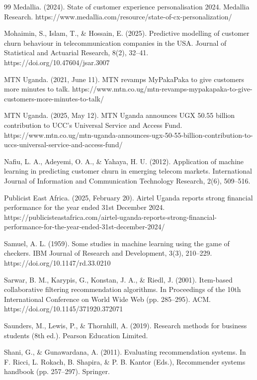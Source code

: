 \begin{thebibliography}{99}
Medallia. (2024). State of customer experience personalisation 2024. Medallia Research. https://www.medallia.com/resource/state-of-cx-personalization/

Mohaimin, S., Islam, T., \& Hossain, E. (2025). Predictive modelling of customer churn behaviour in telecommunication companies in the USA. Journal of Statistical and Actuarial Research, 8(2), 32--41. https://doi.org/10.47604/jsar.3007

MTN Uganda. (2021, June 11). MTN revamps MyPakaPaka to give customers more minutes to talk. https://www.mtn.co.ug/mtn-revamps-mypakapaka-to-give-customers-more-minutes-to-talk/

MTN Uganda. (2025, May 12). MTN Uganda announces UGX 50.55 billion contribution to UCC's Universal Service and Access Fund. https://www.mtn.co.ug/mtn-uganda-announces-ugx-50-55-billion-contribution-to-uccs-universal-service-and-access-fund/

Nafiu, L. A., Adeyemi, O. A., \& Yahaya, H. U. (2012). Application of machine learning in predicting customer churn in emerging telecom markets. International Journal of Information and Communication Technology Research, 2(6), 509--516.

Publicist East Africa. (2025, February 20). Airtel Uganda reports strong financial performance for the year ended 31st December 2024. https://publicisteastafrica.com/airtel-uganda-reports-strong-financial-performance-for-the-year-ended-31st-december-2024/

Samuel, A. L. (1959). Some studies in machine learning using the game of checkers. IBM Journal of Research and Development, 3(3), 210--229. https://doi.org/10.1147/rd.33.0210

Sarwar, B. M., Karypis, G., Konstan, J. A., \& Riedl, J. (2001). Item-based collaborative filtering recommendation algorithms. In Proceedings of the 10th International Conference on World Wide Web (pp. 285--295). ACM. https://doi.org/10.1145/371920.372071

Saunders, M., Lewis, P., \& Thornhill, A. (2019). Research methods for business students (8th ed.). Pearson Education Limited.

Shani, G., \& Gunawardana, A. (2011). Evaluating recommendation systems. In F. Ricci, L. Rokach, B. Shapira, \& P. B. Kantor (Eds.), Recommender systems handbook (pp. 257--297). Springer.


\end{thebibliography}
